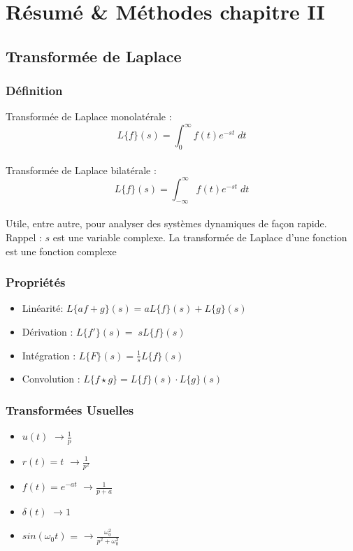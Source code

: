\documentclass[11pt,a4paper]{article}
\begin{document}
\section*{Résumé \& Méthodes chapitre II}
\subsection*{Transformée de Laplace}
\subsubsection*{Définition}
	Transformée de Laplace monolatérale : 
	\[L\{f\}(s) = \displaystyle \int^{\infty}_{0} f(t) e^{-st} \; dt\]\\ 
	\vspace{0.3cm}
	Transformée de Laplace bilatérale : \[L\{f\}(s) = \displaystyle \int^{\infty}_{-\infty} f(t) e^{-st} \; dt\]\\

Utile, entre autre, pour analyser des systèmes dynamiques de façon rapide. \\

Rappel :  $s$ est une variable complexe. La transformée de Laplace d'une fonction est une fonction complexe



\subsubsection*{Propriétés}

\begin{itemize}
\item Linéarité:  $L\{af+g\}(s) = a L\{ f\}(s) + L \{ g \} (s)$
\item Dérivation : $ L\{f'\}(s) = \; s L\{f \}(s)$
\item Intégration : $ L\{F\}(s) = \frac{\displaystyle 1}{\displaystyle s} L\{f \}(s) $
\item Convolution : $ L\{f \star g \} = L\{f \}(s) \cdot L \{ g \} (s)  $
\end{itemize}

\subsubsection*{Transformées Usuelles}
\begin{itemize}
\item $u(t)$  $\rightarrow \frac{\displaystyle 1}{\displaystyle p} $
\item $r(t) = t$  $\rightarrow \frac{\displaystyle 1}{ \displaystyle p^2} $
\item $f(t) = e^{-at}$ $\rightarrow \frac{\displaystyle 1}{\displaystyle p+a} $
\item $\delta (t)$ $\rightarrow 1$ 
\item $sin(\omega_0 t)$ = $\rightarrow \frac{\displaystyle \omega_0^2}{ \displaystyle p^2 + \omega_0^2} $
\end{itemize}
\end{document}
